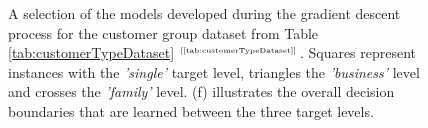 \documentclass[xcolor={table}]{beamer}
\newcommand{\featL}[1]{\textit{'#1'}}
\newcommand{\ourRef}[1]{\ref{#1} $^{\text{\tiny[\pageref{#1}]}}$}
\begin{document}
\begin{frame}[plain]
\begin{figure}[!bth]
\begin{center}
\caption{A selection of the models developed during the gradient descent process for the customer group dataset from Table \ourRef{tab:customerTypeDataset}. Squares represent instances with the \featL{single} target level, triangles the \featL{business} level and crosses the \featL{family} level. (f) illustrates the overall decision boundaries that are learned between the three target levels.}
\label{fig:multinomialRegresionDemo}
\end{center}
\end{figure}
\end{frame} 
\end{document}
